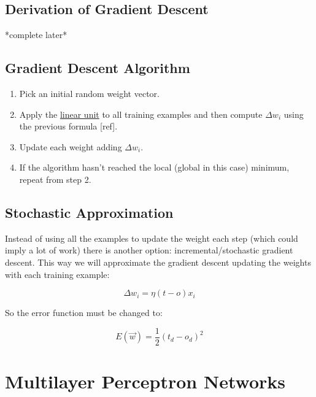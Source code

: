 \documentclass{article}
\begin{document}
	\subsection{Derivation of Gradient Descent}
	*complete later*

	\subsection{Gradient Descent Algorithm}

	\begin{enumerate}
		\item Pick an initial random weight vector.
		\item Apply the \hyperref[linear_unit]{linear unit} to all training examples and then compute $\Delta w_i$  using the previous formula [ref].
		\item Update each weight adding $\Delta w_i$.
		\item If the algorithm hasn’t reached the local (global in this case) minimum, repeat from step 2.
	\end{enumerate}

	\subsection{Stochastic Approximation}
	Instead of using all the examples to update the weight each step (which could imply a lot of work) there is another option: incremental/stochastic gradient descent. This way we will approximate the gradient descent updating the weights with each training example:

	\begin{equation}
		\label{delta_rule}
		\Delta w_{i}= \eta (t - o) x_{i}
	\end{equation}

	So the error function must be changed to:

	\begin{equation}
		\label{error_function_stoc_square}
		E(\vec{w}) = \frac{1}{2} (t_d-o_d)^2 
	\end{equation}

\section{Multilayer Perceptron Networks}
\end{document}

